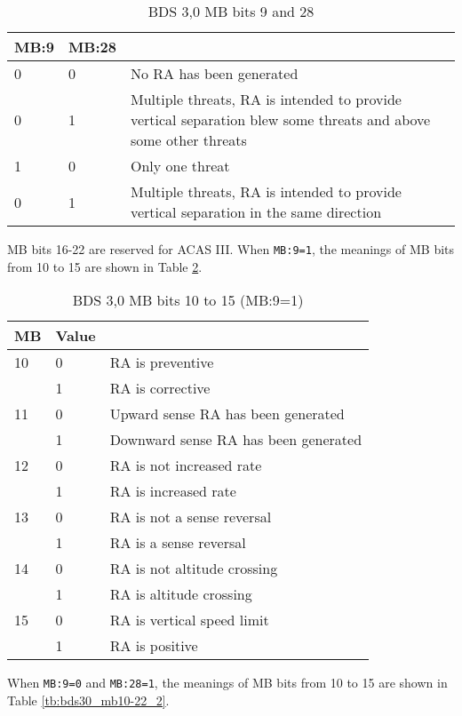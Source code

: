 \begin{table}[ht]
\centering
\caption{BDS 3,0 MB bits 9 and 28}
\label{tb:bds30_mb9_mb28}
\begin{tabular}{|l|l|p{7cm}|}
\hline
\textbf{MB:9} & \textbf{MB:28} & \textbf{} \\ \hline
0 & 0 & No RA has been generated \\ \hline
0 & 1 & Multiple threats, RA is intended to provide vertical separation blew some threats and above some other threats \\ \hline
1 & 0 & Only one threat \\ \hline
0 & 1 & Multiple threats, RA is intended to provide vertical separation in the same direction \\ \hline
\end{tabular}
\end{table}

MB bits 16-22 are reserved for ACAS III. When \texttt{MB:9=1}, the meanings of MB bits from 10 to 15 are shown in Table \ref{tb:bds30_mb10-22_1}.

\begin{table}[]
\centering
\caption{BDS 3,0 MB bits 10 to 15 (MB:9=1)}
\label{tb:bds30_mb10-22_1}
\begin{tabular}{|l|l|l|}
\hline
\textbf{MB} & \textbf{Value} & \textbf{} \\ \hline
10 & 0 & RA is preventive \\ \hline
 & 1 & RA is corrective \\ \hline
11 & 0 & Upward sense RA has been generated \\ \hline
 & 1 & Downward sense RA has been generated \\ \hline
12 & 0 & RA is not increased rate \\ \hline
 & 1 & RA is increased rate \\ \hline
13 & 0 & RA is not a sense reversal \\ \hline
 & 1 & RA is a sense reversal \\ \hline
14 & 0 & RA is not altitude crossing \\ \hline
 & 1 & RA is altitude crossing \\ \hline
15 & 0 & RA is vertical speed limit \\ \hline
 & 1 & RA is positive \\ \hline
\end{tabular}
\end{table}

When \texttt{MB:9=0} and \texttt{MB:28=1}, the meanings of MB bits from 10 to 15 are shown in Table \ref{tb:bds30_mb10-22_2}.

